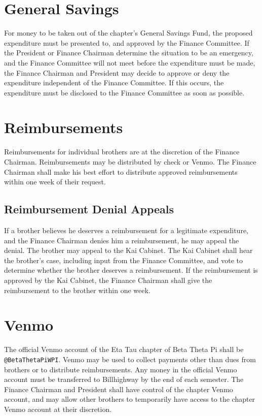 \section{General Savings}

For money to be taken out of the chapter’s General Savings Fund, the proposed
expenditure must be presented to, and approved by the Finance Committee.
If the President or Finance Chairman determine the situation to be an
emergency, and the Finance Committee will not meet before the expenditure must
be made, the Finance Chairman and President may decide to approve or deny the
expenditure independent of the Finance Committee.
If this occurs, the expenditure must be disclosed to the Finance Committee as
soon as possible.

\section{Reimbursements}

Reimbursements for individual brothers are at the discretion of the Finance
Chairman.
Reimbursements may be distributed by check or Venmo.
The Finance Chairman shall make his best effort to distribute approved
reimbursements within one week of their request.

\subsection{Reimbursement Denial Appeals}

If a brother believes he deserves a reimbursement for a legitimate expenditure,
and the Finance Chairman denies him a reimbursement, he may appeal the denial.
The brother may appeal to the Kai Cabinet.
The Kai Cabinet shall hear the brother’s case, including input from the Finance
Committee, and vote to determine whether the brother deserves a reimbursement.
If the reimbursement is approved by the Kai Cabinet, the Finance Chairman shall
give the reimbursement to the brother within one week.

\section{Venmo}

The official Venmo account of the Eta Tau chapter of Beta Theta Pi shall be
\texttt{@BetaThetaPiWPI}.
Venmo may be used to collect payments other than dues from brothers or to
distribute reimbursements.
Any money in the official Venmo account must be transferred to Billhighway by
the end of each semester.
The Finance Chairman and President shall have control of the chapter Venmo
account, and may allow other brothers to temporarily have access to the chapter
Venmo account at their discretion.

